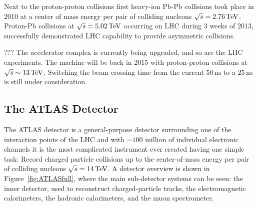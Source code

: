 Next to the proton-proton collisions first heavy-ion Pb-Pb collisions took place
in 2010 at a center of mass energy per pair of colliding nucleons $\sqrt{s} =
2.76 \,\text{TeV}$. Proton-Pb collisions at $\sqrt{s} = 5.02 \,\text{TeV}$ occurring on LHC
during 3 weeks of 2013, successfully demonstrated LHC capability to provide
asymmetric collisions.  

??? The accelerator complex is currently being upgraded, and so are the LHC
experiments. The machine will be back in 2015 with proton-proton collisions at
$\sqrt{s} \sim 13 \,\text{TeV}$. Switching the beam crossing time from the current $50
\, \mbox{ns}$ to a $25 \, \mbox{ns}$ is still under consideration.

\subsection{The ATLAS Detector}

The ATLAS detector \cite{ATLAS} is a general-purpose detector surrounding one of
the interaction points of the LHC and with $\sim 100$ million of individual
electronic channels it is the most complicated instrument ever created having
one simple task: Record charged particle collisions up to the center-of-mass
energy per pair of colliding nucleons $\sqrt{s} = 14 \,\text{TeV}$. A detector overview is
shown in Figure~\ref{fig:ATLASfull}, where the main sub-detector systems can be
seen: the inner detector, used to reconstruct charged-particle tracks, the
electromagnetic calorimeters, the hadronic calorimeters, and the muon
spectrometer. 


